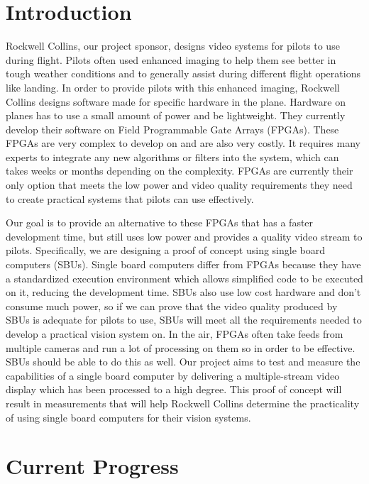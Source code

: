 \documentclass[letterpaper,10pt,titlepage]{IEEEtran}
\begin{document}
   \section{Introduction}
   Rockwell Collins, our project sponsor, designs video systems for pilots to use during flight. Pilots often used enhanced imaging to help them see better in tough weather conditions and to generally assist during different flight operations like landing. In order to provide pilots with this enhanced imaging, Rockwell Collins designs software made for specific hardware in the plane. Hardware on planes has to use a small amount of power and be lightweight. They currently develop their software on Field Programmable Gate Arrays (FPGAs). These FPGAs are very complex to develop on and are also very costly. It requires many experts to integrate any new algorithms or filters into the system, which can takes weeks or months depending on the complexity. FPGAs are currently their only option that meets the low power and video quality requirements they need to create practical systems that pilots can use effectively.\\ 
\par
Our goal is to provide an alternative to these FPGAs that has a faster development time, but still uses low power and provides a quality video stream to pilots. Specifically, we are designing a proof of concept using single board computers (SBUs). Single board computers differ from FPGAs because they have a standardized execution environment which allows simplified code to be executed on it, reducing the development time. SBUs also use low cost hardware and don't consume much power, so if we can prove that the video quality produced by SBUs is adequate for pilots to use, SBUs will meet all the requirements needed to develop a practical vision system on. In the air, FPGAs often take feeds from multiple cameras and run a lot of processing on them so in order to be effective. SBUs should be able to do this as well. Our project aims to test and measure the capabilities of a single board computer by delivering a multiple-stream video display which has been processed to a high degree. This proof of concept will result in measurements that will help Rockwell Collins determine the practicality of using single board computers for their vision systems.

   \section{Current Progress}
\end{document}
